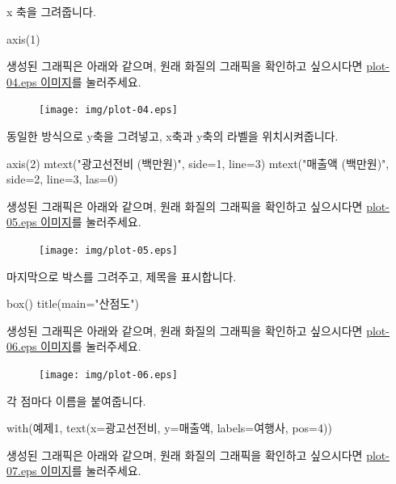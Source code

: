 x 축을 그려줍니다. 
\begin{Schunk}
\begin{Soutput}	
axis(1)
\end{Soutput}
\end{Schunk}
생성된 그래픽은 아래와 같으며, 원래 화질의 그래픽을 확인하고 싶으시다면 \href{http://korea.gnu.org/gnustats/img/plot-04.eps}{plot-04.eps 이미지}를 눌러주세요. 

\begin{figure}
\begin{center}
\texttt{[image: img/plot-04.eps]}
\end{center}
\end{figure}

동일한 방식으로 y축을 그려넣고, x축과 y축의 라벨을 위치시켜줍니다. 
\begin{Schunk}
\begin{Soutput}	
axis(2)
mtext("광고선전비 (백만원)", side=1, line=3)
mtext("매출액 (백만원)", side=2, line=3, las=0)
\end{Soutput}
\end{Schunk}
생성된 그래픽은 아래와 같으며, 원래 화질의 그래픽을 확인하고 싶으시다면 \href{http://korea.gnu.org/gnustats/img/plot-05.eps}{plot-05.eps 이미지}를 눌러주세요. 

\begin{figure}
\begin{center}
\texttt{[image: img/plot-05.eps]}
\end{center}
\end{figure}


마지막으로 박스를 그려주고, 제목을 표시합니다. 
\begin{Schunk}
\begin{Soutput}	
box()
title(main="산점도")
\end{Soutput}
\end{Schunk}
생성된 그래픽은 아래와 같으며, 원래 화질의 그래픽을 확인하고 싶으시다면 \href{http://korea.gnu.org/gnustats/img/plot-06.eps}{plot-06.eps 이미지}를 눌러주세요. 

\begin{figure}
\begin{center}
\texttt{[image: img/plot-06.eps]}
\end{center}
\end{figure}

각 점마다 이름을 붙여줍니다.
\begin{Schunk}
\begin{Soutput}	
with(예제1, text(x=광고선전비, y=매출액, labels=여행사, pos=4))
\end{Soutput}
\end{Schunk}
생성된 그래픽은 아래와 같으며, 원래 화질의 그래픽을 확인하고 싶으시다면 \href{http://korea.gnu.org/gnustats/img/plot-07.eps}{plot-07.eps 이미지}를 눌러주세요. 

